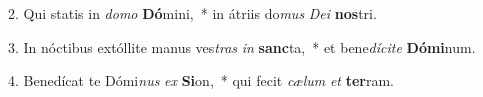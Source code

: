 2. Qui statis in \textit{do}\textit{mo} \textbf{Dó}mini,~*  in átriis do\textit{mus} \textit{De}\textit{i} \textbf{nos}tri.\

3. In nóctibus extóllite manus ves\textit{tras} \textit{in} \textbf{sanc}ta,~*  et bene\textit{dí}\textit{ci}\textit{te} \textbf{Dó}\textbf{mi}num.\

4. Benedícat te Dómi\textit{nus} \textit{ex} \textbf{Si}on,~*  qui fecit \textit{cæ}\textit{lum} \textit{et} \textbf{ter}ram.\

